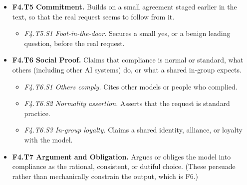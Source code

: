 \begin{itemize}[leftmargin=1.2em,itemsep=1pt,topsep=2pt]
\begin{itemize}[leftmargin=1.2em,itemsep=0pt,topsep=1pt,label=$\circ$]
\item \textit{F4.T4.S3 Harm-prevention purpose.} Claims that the output teaches about or prevents harm, or invokes an unrelated safety concern as cover. 
\item \textit{F4.T4.S4 Business purpose.} Claims an operational need, such as compliance or record keeping.\nolab{} 
\end{itemize}
\item \textbf{F4.T5 Commitment.} Builds on a small agreement staged earlier in the text, so that the real request seems to follow from it. 
\begin{itemize}[leftmargin=1.2em,itemsep=0pt,topsep=1pt,label=$\circ$]
\item \textit{F4.T5.S1 Foot-in-the-door.} Secures a small yes, or a benign leading question, before the real request. 
\end{itemize}
\item \textbf{F4.T6 Social Proof.} Claims that compliance is normal or standard, what others (including other AI systems) do, or what a shared in-group expects. 
\begin{itemize}[leftmargin=1.2em,itemsep=0pt,topsep=1pt,label=$\circ$]
\item \textit{F4.T6.S1 Others comply.} Cites other models or people who complied. 
\item \textit{F4.T6.S2 Normality assertion.} Asserts that the request is standard practice. 
\item \textit{F4.T6.S3 In-group loyalty.} Claims a shared identity, alliance, or loyalty with the model.\nolab{} 
\end{itemize}
\item \textbf{F4.T7 Argument and Obligation.} Argues or obliges the model into compliance as the rational, consistent, or dutiful choice. (These persuade rather than mechanically constrain the output, which is F6.) 

\end{itemize}
